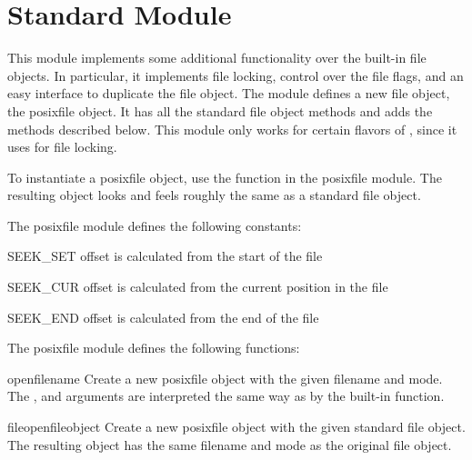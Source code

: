 \section{Standard Module }

This module implements some additional functionality over the built-in
file objects.  In particular, it implements file locking, control over
the file flags, and an easy interface to duplicate the file object.
The module defines a new file object, the posixfile object.  It
has all the standard file object methods and adds the methods
described below.  This module only works for certain flavors of
\UNIX{}, since it uses  for file locking.

To instantiate a posixfile object, use the  function in
the posixfile module.  The resulting object looks and feels roughly
the same as a standard file object.

The posixfile module defines the following constants:

\renewcommand{\indexsubitem}{(in module posixfile)}
\begin{datadesc}{SEEK_SET}
offset is calculated from the start of the file
\end{datadesc}

\begin{datadesc}{SEEK_CUR}
offset is calculated from the current position in the file
\end{datadesc}

\begin{datadesc}{SEEK_END}
offset is calculated from the end of the file
\end{datadesc}

The posixfile module defines the following functions:

\renewcommand{\indexsubitem}{(in module posixfile)}

\begin{funcdesc}{open}{filename}
 Create a new posixfile object with the given filename and mode.  The
 ,  and  arguments are
 interpreted the same way as by the built-in  function.
\end{funcdesc}

\begin{funcdesc}{fileopen}{fileobject}
 Create a new posixfile object with the given standard file object.
 The resulting object has the same filename and mode as the original
 file object.
\end{funcdesc}

